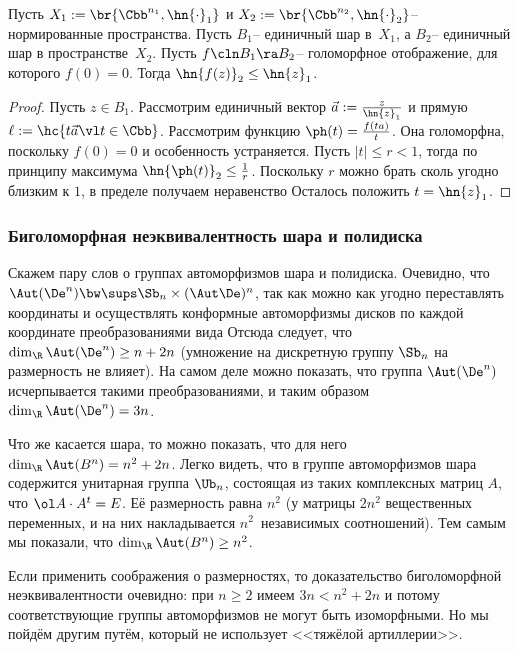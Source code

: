 \documentclass[a4paper]{article}
\begin{document}
\begin{lemma}[Шварца]
Пусть $X_1 := \br{\Cbb^{n_1},\hn{\cdot}_1}$ и $X_2 := \br{\Cbb^{n_2},\hn{\cdot}_2}$--
нормированные пространства. Пусть $B_1$-- единичный шар в~$X_1$, а $B_2$-- единичный
шар в пространстве~$X_2$.
Пусть $f\cln B_1 \ra B_2$-- голоморфное отображение, для которого $f(0) = 0$. Тогда
$\hn{f(z)}_2 \le \hn{z}_1$.
\end{lemma}
\begin{proof}
Пусть $z \in B_1$. Рассмотрим единичный вектор $\vec a := \frac{z}{\hn{z}_1}$ и прямую
$\ell := \hc{t\vec a\vl t \in \Cbb}$. Рассмотрим функцию $\ph(t) = \frac{f(ta)}{t}$.
Она голоморфна, поскольку $f(0) = 0$ и особенность устраняется. Пусть $|t| \le r < 1$,
тогда по принципу максимума $\hn{\ph(t)}_2 \le \frac1r$. Поскольку $r$ можно брать сколь
угодно близким к $1$, в пределе получаем неравенство
Осталось положить $t = \hn{z}_1$.
\end{proof}


\subsubsection{Биголоморфная неэквивалентность шара и полидиска}

Скажем пару слов о группах автоморфизмов шара и полидиска.
Очевидно, что $\Aut(\De^n) \bw\sups \Sb_n \times (\Aut \De)^n$, так как можно как угодно переставлять
координаты и осуществлять конформные автоморфизмы дисков по каждой координате
преобразованиями вида
Отсюда следует, что $\dim_\R \Aut(\De^n) \ge n+2n$ (умножение на дискретную группу $\Sb_n$
на размерность не влияет).
На самом деле можно показать, что группа $\Aut(\De^n)$ исчерпывается такими преобразованиями,
и таким образом $\dim_\R \Aut(\De^n) = 3n$.

Что же касается шара, то можно показать, что для него $\dim_\R \Aut(B^n) = n^2 + 2n$. Легко видеть, что
в группе автоморфизмов шара содержится унитарная группа $\Ub_n$, состоящая из таких комплексных
матриц $A$, что $\ol A \cdot A^t = E$. Её размерность равна $n^2$ (у матрицы $2n^2$ вещественных переменных,
и на них накладывается $n^2$~независимых соотношений). Тем самым мы показали, что $\dim_\R \Aut(B^n) \ge n^2$.

Если применить соображения о размерностях, то доказательство биголоморфной неэквивалентности очевидно:
при $n \ge 2$ имеем $3n < n^2 +2n$ и потому соответствующие группы автоморфизмов не могут быть изоморфными.
Но мы пойдём другим путём, который не использует <<тяжёлой артиллерии>>.
\end{document}

